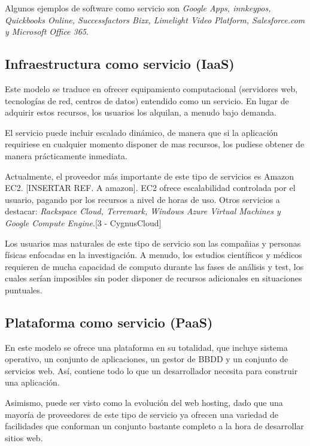 Algunos ejemplos de software como servicio son \textit{Google Apps, innkeypos, Quickbooks Online, Successfactors Bizx, Limelight Video Platform, Salesforce.com y Microsoft Office 365}.

\subsection{Infraestructura como servicio (IaaS)}

Este modelo se traduce en ofrecer equipamiento computacional (servidores web, tecnolog\'ias de red, centros de datos) entendido como un servicio. En lugar de adquirir estos recursos, los usuarios los alquilan, a menudo bajo demanda.

El servicio puede incluir escalado din\'amico, de manera que si la aplicaci\'on requiriese en cualquier momento disponer de mas recursos, los pudiese obtener de manera pr\'acticamente inmediata.

Actualmente, el proveedor m\'as importante de este tipo de servicios es Amazon EC2. [INSERTAR REF. A amazon]. EC2 ofrece escalabilidad controlada por el usuario, pagando por los recursos a nivel de horas de uso. Otros servicios a destacar: \textit{Rackspace Cloud, Terremark, Windows Azure Virtual Machines y Google Compute Engine}.[3 - CygnusCloud]

Los usuarios mas naturales de este tipo de servicio son las compa\~nias y personas f\'isicas enfocadas en la investigaci\'on. A menudo, los estudios cient\'ificos y m\'edicos requieren de mucha capacidad de computo durante las fases de an\'alisis y test, los cuales ser\'ian imposibles sin poder disponer de recursos adicionales en situaciones puntuales.

\subsection{Plataforma como servicio (PaaS)}

En este modelo se ofrece una plataforma en su totalidad, que incluye sistema operativo, un conjunto de aplicaciones, un gestor de BBDD y un conjunto de servicios web. As\'i, contiene todo lo que un desarrollador necesita para construir una aplicaci\'on.

Asimismo, puede ser visto como la evoluci\'on del web hosting, dado que una mayor\'ia de proveedores de este tipo de servicio ya ofrecen una variedad de facilidades que conforman un conjunto bastante completo a la hora de desarrollar sitios web.


